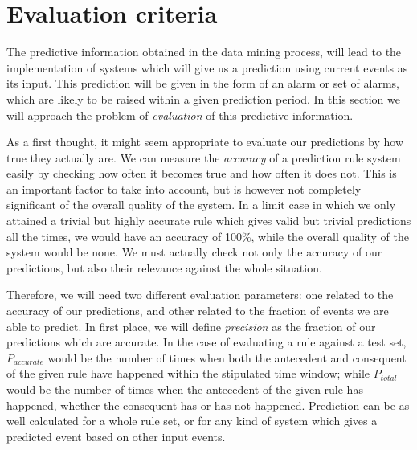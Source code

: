 \documentclass[a4paper,12pt]{article}
\begin{document}

\section{Evaluation criteria}
The predictive information obtained in the data mining process, will lead to the implementation of systems which will give us a prediction using current events as its input. This prediction will be given in the form of an alarm or set of alarms, which are likely to be raised within a given prediction period. In this section we will approach the problem of \emph{evaluation} of this predictive information.

As a first thought, it might seem appropriate to evaluate our predictions by how true they actually are. We can measure the \emph{accuracy} of a prediction rule system easily by checking how often it becomes true and how often it does not. This is an important factor to take into account, but is however not completely significant of the overall quality of the system. In a limit case in which we only attained a trivial but highly accurate rule which gives valid but trivial predictions all the times, we would have an accuracy of 100\%, while the overall quality of the system would be none. We must actually check not only the accuracy of our predictions, but also their relevance against the whole situation.

Therefore, we will need two different evaluation parameters: one related to the accuracy of our predictions, and other related to the fraction of events we are able to predict\cite{torgo2003data}. In first place, we will define \emph{precision} as the fraction of our predictions which are accurate. In the case of evaluating a rule against a test set, $P_{accurate}$ would be the number of times when both the antecedent and consequent of the given rule have happened within the stipulated time window; while $P_{total}$ would be the number of times when the antecedent of the given rule has happened, whether the consequent has or has not happened. Prediction can be as well calculated for a whole rule set, or for any kind of system which gives a predicted event based on other input events.
\end{document}
